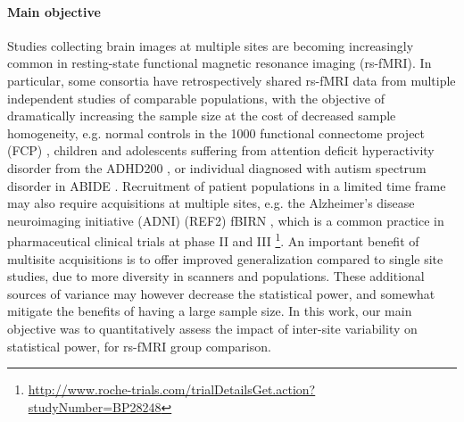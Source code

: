 \documentclass[authoryear]{elsarticle}
\begin{document}
\paragraph{Main objective}
Studies collecting brain images at multiple sites are becoming increasingly common in resting-state functional magnetic resonance imaging (rs-fMRI). In particular, some consortia have retrospectively shared rs-fMRI data from multiple independent studies of comparable populations, with the objective of dramatically increasing the sample size at the cost of decreased sample homogeneity, e.g. normal controls in the 1000 functional connectome project (FCP) \citep{Biswal2010}, children and adolescents suffering from attention deficit hyperactivity disorder from the ADHD200 \citep{ADHD200,Fair2012}, or individual diagnosed with autism spectrum disorder in ABIDE \citep{Nielsen2013}. Recruitment of patient populations in a limited time frame may also require acquisitions at multiple sites, e.g. the Alzheimer’s disease neuroimaging initiative (ADNI) \citep{Mueller2005} (REF2) fBIRN \citep{Friedman2006,Friedman2006a}, which is a common practice in pharmaceutical clinical trials at phase II and III \footnote{\url{http://www.roche-trials.com/trialDetailsGet.action?studyNumber=BP28248}}. An important benefit of multisite acquisitions is to offer improved generalization compared to single site studies, due to more diversity in scanners and populations. These additional sources of variance may however decrease the statistical power, and somewhat mitigate the benefits of having a large sample size. In this work, our main objective was to quantitatively assess the impact of inter-site variability on statistical power, for rs-fMRI group comparison.
\end{document}
